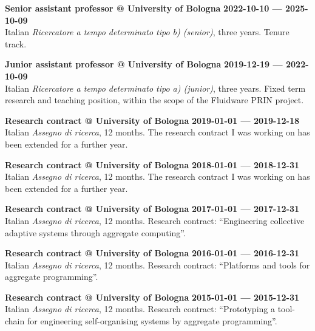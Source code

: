 \textbf{Senior assistant professor @ University of Bologna} \hfill \textbf{2022-10-10 --- 2025-10-09}\\
Italian \emph{Ricercatore a tempo determinato tipo b) (senior)}, three years.
Tenure track.

\halfblankline{}

\textbf{Junior assistant professor @ University of Bologna} \hfill \textbf{2019-12-19 --- 2022-10-09}\\
Italian \emph{Ricercatore a tempo determinato tipo a) (junior)}, three years.
Fixed term research and teaching position,
within the scope of the Fluidware PRIN project.

\halfblankline{}

\textbf{Research contract @ University of Bologna} \hfill \textbf{2019-01-01 --- 2019-12-18}\\
Italian \emph{Assegno di ricerca}, 12 months.
The research contract I was working on has been extended for a further year.

\halfblankline{}

\textbf{Research contract @ University of Bologna} \hfill \textbf{2018-01-01 --- 2018-12-31}\\
Italian \emph{Assegno di ricerca}, 12 months.
The research contract I was working on has been extended for a further year.

\halfblankline{}

\textbf{Research contract @ University of Bologna} \hfill \textbf{2017-01-01 --- 2017-12-31}\\
Italian \emph{Assegno di ricerca}, 12 months.
Research contract: ``Engineering collective adaptive systems through aggregate computing''.

\halfblankline{}

\textbf{Research contract @ University of Bologna} \hfill \textbf{2016-01-01 --- 2016-12-31}\\
Italian \emph{Assegno di ricerca}, 12 months.
Research contract: ``Platforms and tools for aggregate programming''.

\halfblankline{}

\textbf{Research contract @ University of Bologna} \hfill \textbf{2015-01-01 --- 2015-12-31}\\
Italian \emph{Assegno di ricerca}, 12 months.
Research contract: ``Prototyping a tool-chain for engineering self-organising systems by aggregate programming''.

\halfblankline{}

